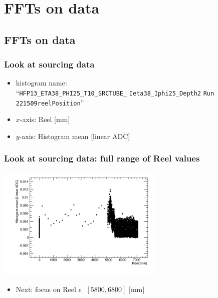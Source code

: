 \documentclass[bigger]{beamer}
\begin{document}
\section{FFTs on data}
\label{sec-3}
\subsection{FFTs on data}
\label{sec-3-1}
\begin{frame}
\frametitle{Look at sourcing data}
\label{sec-3-1-1}
\begin{itemize}

\item histogram name:\\
\label{sec-3-1-1-1}%
``\texttt{HFP13\_ETA38\_PHI25\_T10\_SRCTUBE\_} \newline{}
\texttt{Ieta38\_Iphi25\_Depth2}  \newline{}
\texttt{Run 221509reelPosition}''

\item $x$-axis: Reel [mm]
\label{sec-3-1-1-2}%

\item $y$-axis: Histogram mean [linear ADC]
\label{sec-3-1-1-3}%
\end{itemize} %
\end{frame}
\begin{frame}
\frametitle{Look at sourcing data: full range of Reel values}
\label{sec-3-1-2}
\label{sec-3-1-2-1}

\centering
\includegraphics[width=0.6\textwidth]{fig/sourcing_unzoomed_plot.png}
\begin{itemize}

\item Next: focus on \(\text{Reel } \epsilon \text{ } [5800, 6800] \text{ [mm]}\)
\label{sec-3-1-2-2}%

\end{itemize} %
\end{frame}
\end{document}
